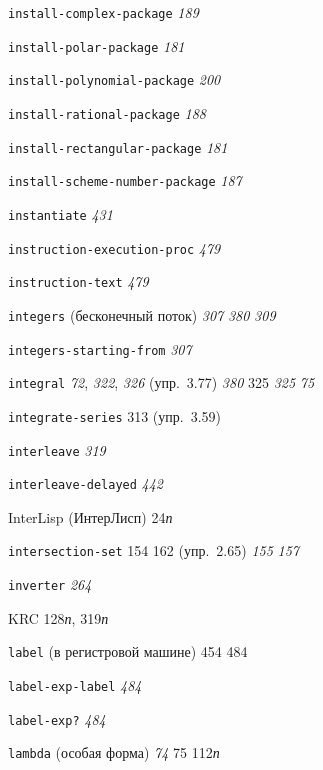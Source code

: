 \begin{theindex}
\item {\texttt{install-complex-package}} {\it 189}
\item {\texttt{install-polar-package}} {\it 181}
\item {\texttt{install-polynomial-package}} {\it 200}
\item {\texttt{install-rational-package}} {\it 188}
\item {\texttt{install-rectangular-package}} {\it 181}
\item {\texttt{install-scheme-number-package}} {\it 187}
\item {\texttt{instantiate}} {\it 431}
\item {\texttt{instruction-execution-proc}} {\it 479}
\item {\texttt{instruction-text}} {\it 479}
\item {\texttt{integers} (бесконечный поток)} {\it 307}
   {\it 380}
   {\it 309}
\item {\texttt{integers-starting-from}} {\it 307}
\item {\texttt{integral}} {\it 72}, {\it 322}, {\it 326} (упр.~3.77)
   {\it 380}
   325
   {\it 325}
   {\it 75}
\item {\texttt{integrate-series}} 313 (упр.~3.59)
\item {\texttt{interleave}} {\it 319}
\item {\texttt{interleave-delayed}} {\it 442}
\item {InterLisp (ИнтерЛисп)} 24{\it п}
\item {\texttt{intersection-set}} 154
   162 (упр.~2.65)
   {\it 155}
   {\it 157}
\item {\texttt{inverter}} {\it 264}
\bigskip
\item {KRC} 128{\it п}, 319{\it п}
\bigskip
\item {\texttt{label} (в регистровой машине)} 454
   484
\item {\texttt{label-exp-label}} {\it 484}
\item {\texttt{label-exp?}} {\it 484}
\item {\texttt{lambda} (особая форма)} {\it 74}
   75
   112{\it п}

\end{theindex}
